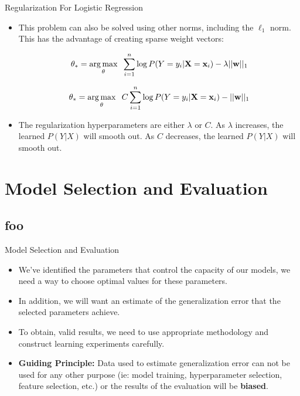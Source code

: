 \documentclass[serif,xcolor=pdftex,dvipsnames,table,hyperref={bookmarks=false}]{beamer}
\begin{document}
\begin{frame}[t]{Regularization For Logistic Regression}

\begin{itemize}
\setlength{\itemsep}{6pt}

\item This problem can also be solved using other norms, including the $\ell_1$ norm. This has the advantage of creating sparse weight vectors: 

\pause
$$\theta_* =  \operatorname*{arg\,max}_{\theta}\;\;\sum_{i=1}^n \log P(Y=y_i|{\mathbf{X}}={\mathbf{x}}_i) - \lambda ||{\mathbf{w}}||_1 $$

$$\theta_* = \operatorname*{arg\,max}_{\theta}\;\; C\sum_{i=1}^n \log P(Y=y_i|{\mathbf{X}}={\mathbf{x}}_i) - ||{\mathbf{w}}||_1 $$

\pause\item The regularization hyperparameters are either $\lambda$ or $C$. As $\lambda$ increases, the learned $P(Y|X)$ will smooth out. As $C$ decreases, the learned $P(Y|X)$ will smooth out.

\end{itemize}
\end{frame}

\section{Model Selection and Evaluation}
\subsection{foo}

\begin{frame}[t]{Model Selection and Evaluation}
\begin{itemize}
\setlength{\itemsep}{12pt}

\item We've identified the parameters that control the capacity of our models, we need a way to choose optimal values for these parameters. 

\pause\item In addition, we will want an estimate of the generalization error that the selected parameters achieve.

\pause\item To obtain, valid results, we need to use appropriate methodology and construct learning experiments carefully.

\pause\item\textbf{Guiding Principle:} Data used to estimate generalization error can not be used for any other purpose (ie: model training, hyperparameter selection, feature selection, etc.) or the results of the evaluation will be \textbf{biased}.

\end{itemize}
\end{frame}
\end{document}
